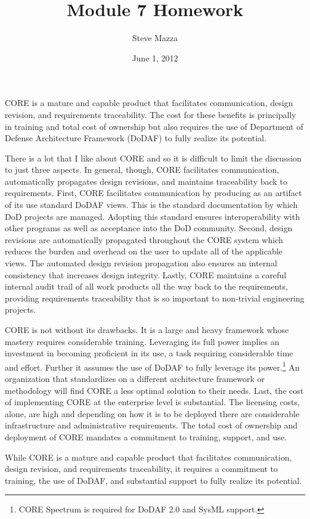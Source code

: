\documentclass[letterpaper,12pt]{article}
\title{Module 7 Homework}
\author{Steve Mazza}
\date{June 1, 2012}
\begin{document}
\maketitle


CORE is a mature and capable product that facilitates communication, design revision, and requirements traceability.  The cost for these benefits is principally in training and total cost of ownership but also requires the use of  Department of Defense Architecture Framework (DoDAF) to fully realize its potential.

There is a lot that I like about CORE and so it is difficult to limit the discussion to just three aspects.  In general, though, CORE facilitates communication, automatically propagates design revisions, and maintains traceability back to requirements.  First, CORE facilitates communication by producing as an artifact of its use standard DoDAF views.  This is the standard documentation by which DoD projects are managed.  Adopting this standard ensures interoperability with other programs as well as acceptance into the DoD community.  Second, design revisions are automatically propagated throughout the CORE system which reduces the burden and overhead on the user to update all of the applicable views.  The automated design revision propagation also ensures an internal consistency that increases design integrity.  Lastly, CORE maintains a careful internal audit trail of all work products all the way back to the requirements, providing requirements traceability that is so important to non-trivial engineering projects.

CORE is not without its drawbacks. It is a large and heavy framework whose mastery requires considerable training.  Leveraging its full power implies an investment in becoming proficient in its use, a task requiring considerable time and effort.  Further it assumes the use of DoDAF to fully leverage its power.\footnote{CORE Spectrum is required for DoDAF 2.0 and SysML support.}  An organization that standardizes on a different architecture framework or methodology will find CORE a less optimal solution to their needs.  Last, the cost of implementing CORE at the enterprise level is substantial.  The licensing costs, alone, are high and depending on how it is to be deployed there are considerable infrastructure and administrative requirements.  The total cost of ownership and deployment of CORE mandates a commitment to training, support, and use.

While CORE is a mature and capable product that facilitates communication, design revision, and requirements traceability, it requires a commitment to training, the use of DoDAF, and substantial support to fully realize its potential.
\end{document}
